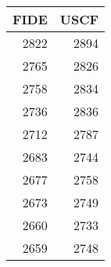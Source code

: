 \documentclass[11pt]{article}
\author{tien}
\date{\today}
\title{}
\begin{document}
\tableofcontents

\begin{center}
\begin{tabular}{rr}
FIDE & USCF\\
\hline
2822 & 2894\\
2765 & 2826\\
2758 & 2834\\
2736 & 2836\\
2712 & 2787\\
2683 & 2744\\
2677 & 2758\\
2673 & 2749\\
2660 & 2733\\
2659 & 2748\\
\end{tabular}
\end{center}
\end{document}
